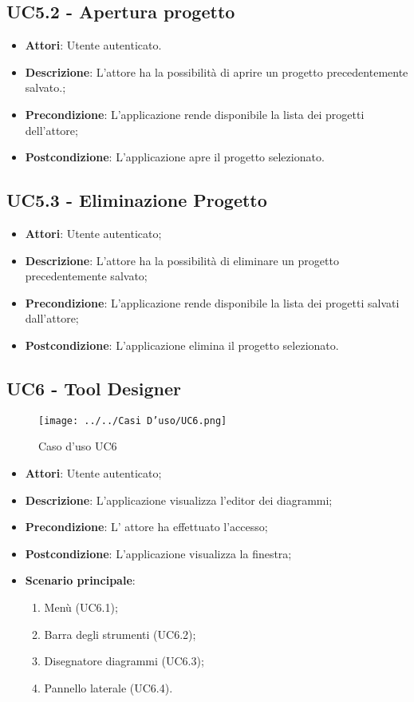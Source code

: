 \subsection{UC5.2 - Apertura progetto} 
\label{ssec:UC5.2} 
\begin{itemize} 
\item \textbf{Attori}: Utente autenticato.
\item \textbf{Descrizione}: L’attore ha la possibilità di aprire un progetto precedentemente salvato.;
\item \textbf{Precondizione}: L’applicazione rende disponibile la lista dei progetti dell'attore;
\item \textbf{Postcondizione}: L’applicazione apre il progetto selezionato.
\end{itemize} 
\subsection{UC5.3 - Eliminazione Progetto} 
\label{ssec:UC5.3} 
\begin{itemize} 
\item \textbf{Attori}: Utente autenticato;
\item \textbf{Descrizione}: L'attore ha la possibilità di eliminare un progetto precedentemente salvato;
\item \textbf{Precondizione}: L’applicazione rende disponibile la lista dei progetti salvati dall'attore;
\item \textbf{Postcondizione}: L’applicazione elimina il progetto selezionato.
\end{itemize} 
\newpage
\subsection{UC6 - Tool Designer} 
\label{ssec:UC6} 
\begin{figure}[h!] 
\centering 
\texttt{[image: ../../Casi D'uso/UC6.png]} 
\caption{Caso d'uso UC6} 
 \end{figure} 
\begin{itemize} 
\item \textbf{Attori}: Utente autenticato;
\item \textbf{Descrizione}: L'applicazione visualizza l'editor dei diagrammi;
\item \textbf{Precondizione}: L' attore ha effettuato l'accesso;
\item \textbf{Postcondizione}: L'applicazione visualizza la finestra;
\item \textbf{Scenario principale}: \begin{enumerate}\item Menù (UC6.1);\item Barra degli strumenti (UC6.2);\item Disegnatore diagrammi (UC6.3);\item Pannello laterale (UC6.4). 
 \end{enumerate}
\end{itemize} 
\newpage
